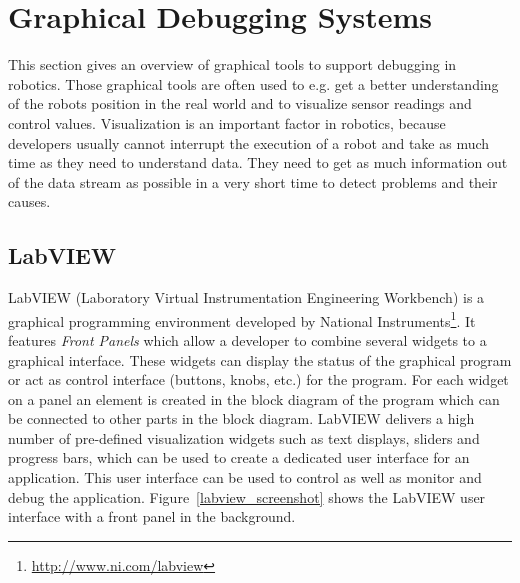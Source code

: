 \section{Graphical Debugging Systems}
This section gives an overview of graphical tools to support debugging in robotics. Those graphical tools are often used to e.g. get a better understanding of the robots position in the real world and to visualize sensor readings and control values. Visualization is an important factor in robotics, because developers usually cannot interrupt the execution of a robot and take as much time as they need to understand data. They need to get as much information out of the data stream as possible in a very short time to detect problems and their causes.

\subsection{LabVIEW}

LabVIEW (Laboratory Virtual Instrumentation Engineering Workbench) is a graphical programming environment developed by National Instruments\footnote{\url{http://www.ni.com/labview}}. It features \emph{Front Panels} which allow a developer to combine several widgets to a graphical interface. These widgets can display the status of the graphical program or act as control interface (buttons, knobs, etc.) for the program. For each widget on a panel an element is created in the block diagram of the program which can be connected to other parts in the block diagram. LabVIEW delivers a high number of pre-defined visualization widgets such as text displays, sliders and progress bars, which can be used to create a dedicated user interface for an application. This user interface can be used to control as well as monitor and debug the application. Figure~\ref{labview_screenshot} shows the LabVIEW user interface with a front panel in the background.

